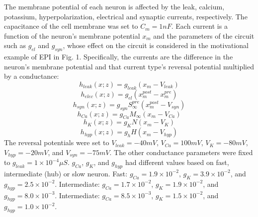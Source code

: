\documentclass[11pt]{article}
\begin{document}
The membrane potential of each neuron is affected by the leak, calcium, potassium, hyperpolarization,
electrical and synaptic currents, respectively.  The capacitance of the cell membrane was set to $C_m = 1nF$. Each current is a function of the neuron's membrane potential $x_m$ and the parameters of the circuit such as  $g_{el}$ and $g_{syn}$, whose effect on the circuit is considered in the motivational example of EPI in Fig. 1.  Specifically, the currents are the difference in the neuron's membrane potential and that current type's reversal potential multiplied by a conductance:
\begin{equation}  h_{leak}(x; z) = g_{leak} (x_m - V_{leak}) 
\end{equation} 
\begin{equation}  h_{elec}(x; z) = g_{el} (x_m^{post} - x_m^{pre})
\end{equation} 
\begin{equation}  h_{syn}(x; z) = g_{syn} S_\infty^{pre} (x_m^{post} - V_{syn}) \end{equation} 
\begin{equation}  h_{Ca}(x; z) = g_{Ca} M_\infty (x_m - V_{Ca}) 
\end{equation} 
\begin{equation}  h_K(x; z) = g_K N (x_m - V_K) 
\end{equation} 
\begin{equation}  h_{hyp}(x; z) = g_h H(x_m - V_{hyp})
\end{equation} 
The reversal potentials were set to $V_{leak} = -40mV$, $V_{Ca} = 100mV$, $V_K = -80mV$, $V_{hyp} = -20mV$, and $V_{syn} = -75mV$.  The other conductance parameters were fixed to $g_{leak} = 1 \times 10^{-4} \mu S$. $g_{Ca}$, $g_{K}$, and $g_{hyp}$ had different values based on fast, intermediate (hub) or slow neuron.  Fast: $g_{Ca} = 1.9 \times 10^{-2}$, $ g_K = 3.9 \times 10^{-2} $, and $ g_{hyp} = 2.5 \times 10^{-2} $.  Intermediate: $g_{Ca} = 1.7 \times 10^{-2}$, $ g_K = 1.9 \times 10^{-2} $, and $ g_{hyp} = 8.0 \times 10^{-3} $.  Intermediate: $g_{Ca} = 8.5 \times 10^{-3}$, $ g_K = 1.5 \times 10^{-2} $, and $ g_{hyp} = 1.0 \times 10^{-2} $.
\end{document}
